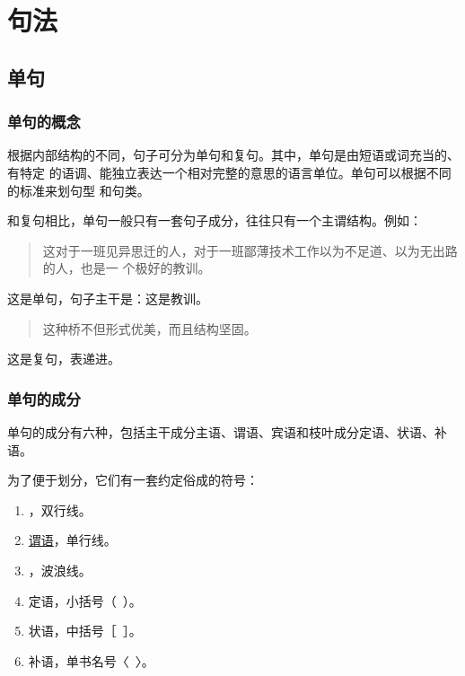 \documentclass[final,oneside]{ctexbook}
\newenvironment{equotation}{\begin{quotation}\kaishu}{\end{quotation}}
\begin{document}
\section{句法}

\subsection{单句}

\subsubsection{单句的概念}

根据内部结构的不同，句子可分为单句和复句。其中，单句是由短语或词充当的、有特定
的语调、能独立表达一个相对完整的意思的语言单位。单句可以根据不同的标准来划句型
和句类。

和复句相比，单句一般只有一套句子成分，往往只有一个主谓结构。例如：
\begin{equotation}
  这对于一班见异思迁的人，对于一班鄙薄技术工作以为不足道、以为无出路的人，也是一
  个极好的教训。
\end{equotation}
这是单句，句子主干是：这是教训。
\begin{equotation}
  这种桥不但形式优美，而且结构坚固。
\end{equotation}
这是复句，表递进。

\subsubsection{单句的成分}

单句的成分有六种，包括主干成分主语、谓语、宾语和枝叶成分定语、状语、补语。

为了便于划分，它们有一套约定俗成的符号：

\begin{enumerate}
  \item {}，双行线。

  \item \uline{谓语}，单行线。

  \item {}，波浪线。

  \item 定语，小括号（~）。

  \item 状语，中括号［~］。

  \item 补语，单书名号〈~〉。
\end{enumerate}
\end{document}

